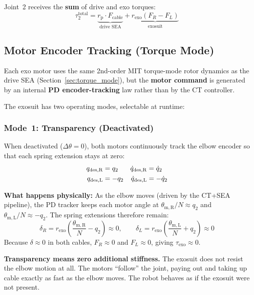 \documentclass[11pt,a4paper]{article}
\newcommand{\rp}{r_{\mathrm{p}}}
\begin{document}
Joint~2 receives the \textbf{sum} of drive and exo torques:
\begin{equation}
    \tau_2^{\mathrm{total}} = \underbrace{\rp \cdot F_{\mathrm{cable}}}_{\text{drive SEA}} + \underbrace{r_{\mathrm{exo}} (F_R - F_L)}_{\text{exosuit}}
\label{eq:tau2_total}
\end{equation}


\subsection{Motor Encoder Tracking (Torque Mode)}
\label{sec:exo_motor}

Each exo motor uses the same 2nd-order MIT torque-mode rotor dynamics as the
drive SEA (Section~\ref{sec:torque_mode}), but the \textbf{motor command} is
generated by an internal \textbf{PD encoder-tracking} law rather than by the
CT controller.

The exosuit has two operating modes, selectable at runtime:

\subsubsection{Mode~1: Transparency (Deactivated)}
\label{sec:exo_transparent}

When deactivated ($\Delta\theta = 0$), both motors continuously track the
elbow encoder so that each spring extension stays at zero:
\begin{align}
    q_{\mathrm{des,R}} &=  q_2   &  \dot{q}_{\mathrm{des,R}} &=  \dot{q}_2 \notag\\
    q_{\mathrm{des,L}} &= -q_2   &  \dot{q}_{\mathrm{des,L}} &= -\dot{q}_2
\label{eq:exo_deactivated}
\end{align}

\textbf{What happens physically:}
As the elbow moves (driven by the CT+SEA pipeline), the PD tracker keeps each
motor angle at $\theta_{\mathrm{m,R}}/N \approx q_2$ and
$\theta_{\mathrm{m,L}}/N \approx -q_2$.  The spring extensions therefore
remain:
\[
    \delta_R = r_{\mathrm{exo}}\!\left(\frac{\theta_{\mathrm{m,R}}}{N} - q_2\right) \approx 0, \qquad
    \delta_L = r_{\mathrm{exo}}\!\left(\frac{\theta_{\mathrm{m,L}}}{N} + q_2\right) \approx 0
\]
Because $\delta \approx 0$ in both cables, $F_R \approx 0$ and $F_L \approx 0$, giving
$\tau_{\mathrm{exo}} \approx 0$.

\begin{resultbox}
\textbf{Transparency means zero additional stiffness.}
The exosuit does not resist the elbow motion at all.  The motors ``follow''
the joint, paying out and taking up cable exactly as fast as the elbow moves.
The robot behaves as if the exosuit were not present.
\end{resultbox}
\end{document}
